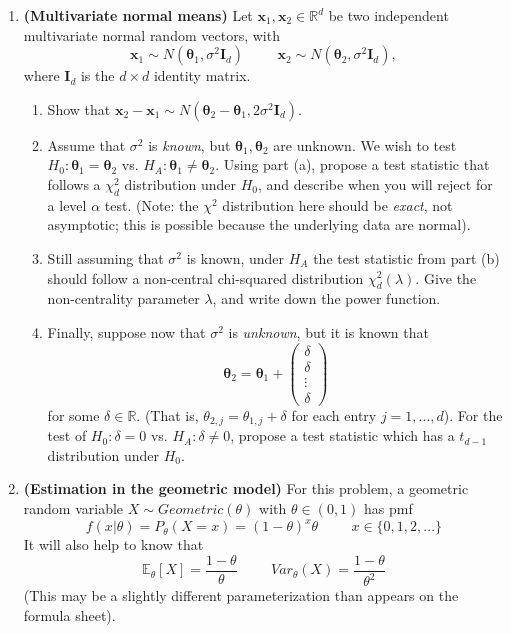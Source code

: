 \documentclass[11pt]{article}
\begin{document}
\begin{enumerate}
\bigskip

\item \textbf{(Multivariate normal means)} Let $\mathbf{x}_1, \mathbf{x}_2 \in \mathbb{R}^d$ be two independent multivariate normal random vectors, with
$$\mathbf{x}_1 \sim N(\boldsymbol{\theta}_1, \sigma^2 \mathbf{I}_d) \hspace{1cm} \mathbf{x}_2 \sim N(\boldsymbol{\theta}_2, \sigma^2 \mathbf{I}_d),$$
where $\mathbf{I}_d$ is the $d \times d$ identity matrix.

\begin{enumerate}
\item Show that $\mathbf{x}_2 - \mathbf{x}_1 \sim N(\boldsymbol{\theta}_2 - \boldsymbol{\theta}_1, 2 \sigma^2 \mathbf{I}_d)$.

\item Assume that $\sigma^2$ is \textit{known}, but $\boldsymbol{\theta}_1, \boldsymbol{\theta}_2$ are unknown. We wish to test $H_0: \boldsymbol{\theta}_1 = \boldsymbol{\theta}_2$ vs. $H_A: \boldsymbol{\theta}_1 \neq \boldsymbol{\theta}_2$. Using part (a), propose a test statistic that follows a $\chi^2_d$ distribution under $H_0$, and describe when you will reject for a level $\alpha$ test. (Note: the $\chi^2$ distribution here should be \textit{exact}, not asymptotic; this is possible because the underlying data are normal).

\item Still assuming that $\sigma^2$ is known, under $H_A$ the test statistic from part (b) should follow a non-central chi-squared distribution $\chi^2_d(\lambda)$. Give the non-centrality parameter $\lambda$, and write down the power function.

\item Finally, suppose now that $\sigma^2$ is \textit{unknown}, but it is known that
$$\boldsymbol{\theta}_2 = \boldsymbol{\theta}_1 + \begin{pmatrix}
\delta \\ \delta \\ \vdots \\ \delta
\end{pmatrix}$$
for some $\delta \in \mathbb{R}$. (That is, $\theta_{2,j} = \theta_{1,j} + \delta$ for each entry $j = 1,...,d$). For the test of $H_0: \delta = 0$ vs. $H_A: \delta \neq 0$, propose a test statistic which has a $t_{d-1}$ distribution under $H_0$.
\end{enumerate}

\bigskip

\item \textbf{(Estimation in the geometric model)} For this problem, a geometric random variable $X \sim Geometric(\theta)$ with $\theta \in (0, 1)$ has pmf
$$f(x|\theta) = P_\theta(X = x) = (1 - \theta)^x \theta \hspace{1cm} x \in \{0, 1, 2, ...\}$$
It will also help to know that 
$$\mathbb{E}_\theta[X] = \dfrac{1 - \theta}{\theta} \hspace{1cm} Var_\theta(X) = \dfrac{1 - \theta}{\theta^2}$$
(This may be a slightly different parameterization than appears on the formula sheet).


\end{enumerate}
\end{document}
